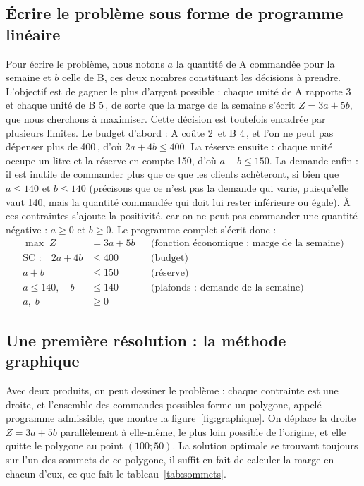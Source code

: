 \documentclass[11pt,a4paper]{article}
\newcommand{\eur}{\,\text{€}}
\begin{document}
\subsection{Écrire le problème sous forme de programme linéaire}
Pour écrire le problème, nous notons $a$ la quantité de A commandée pour la semaine et $b$
celle de B, ces deux nombres constituant les décisions à prendre. L'objectif est de gagner le
plus d'argent possible : chaque unité de A rapporte 3\eur{} et chaque unité de B 5\eur{}, de
sorte que la marge de la semaine s'écrit $Z = 3a + 5b$, que nous cherchons à maximiser.
Cette décision est toutefois encadrée par plusieurs limites. Le budget d'abord : A coûte
2\eur{} et B 4\eur, et l'on ne peut pas dépenser plus de 400\eur, d'où $2a + 4b \le 400$. La
réserve ensuite : chaque unité occupe un litre et la réserve en compte 150, d'où
$a + b \le 150$. La demande enfin : il est inutile de commander plus que ce que les clients
achèteront, si bien que $a \le 140$ et $b \le 140$ (précisons que ce n'est pas la demande qui
varie, puisqu'elle vaut 140, mais la quantité commandée qui doit lui rester inférieure ou
égale). À ces contraintes s'ajoute la positivité, car on ne peut pas commander une quantité
négative : $a \ge 0$ et $b \ge 0$. Le programme complet s'écrit donc :
\begin{align*}
\max\; Z &= 3a + 5b && \text{(fonction économique : marge de la semaine)}\\
\text{SC :}\quad 2a + 4b &\le 400 && \text{(budget)}\\
a + b &\le 150 && \text{(réserve)}\\
a \le 140,\quad b &\le 140 && \text{(plafonds : demande de la semaine)}\\
a,\; b &\ge 0
\end{align*}

\subsection{Une première résolution : la méthode graphique}
Avec deux produits, on peut dessiner le problème : chaque contrainte est une droite, et
l'ensemble des commandes possibles forme un polygone, appelé programme admissible, que montre
la figure~\ref{fig:graphique}. On déplace la droite $Z = 3a + 5b$ parallèlement à elle-même,
le plus loin possible de l'origine, et elle quitte le polygone au point $(100 ; 50)$. La
solution optimale se trouvant toujours sur l'un des sommets de ce polygone, il suffit en fait
de calculer la marge en chacun d'eux, ce que fait le tableau~\ref{tab:sommets}.
\end{document}
